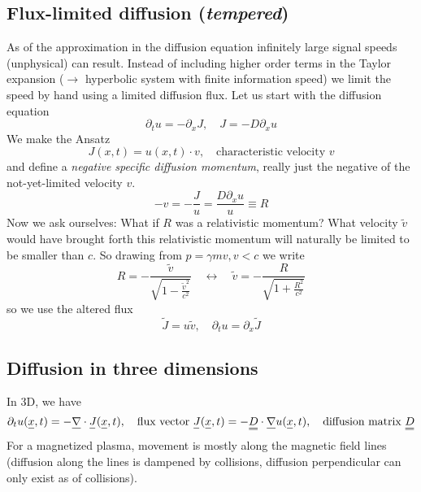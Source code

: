 \subsection{Flux-limited diffusion (\textit{tempered})}
As of the approximation in the diffusion equation infinitely large signal speeds 
(unphysical) can result. Instead of including higher order terms in the Taylor expansion 
($\rightarrow$ hyperbolic system with finite information speed) \textcolor{blue1}{we limit the speed by hand 
using a limited diffusion flux}.
Let us start with the diffusion equation
\begin{equation}
    \partial_t u = - \partial_x J, \quad J = - D \partial_x u
\end{equation}
We make the Ansatz
\begin{equation}
    J(x,t) = u(x,t) \cdot v, \quad \text{characteristic velocity } v
\end{equation}
and define a \textit{negative specific diffusion momentum}, really just the negative of the
not-yet-limited velocity $v$.
\begin{equation}
    -v = -\frac{J}{u} = \frac{D\partial_x u}{u} \equiv R
\end{equation}
Now we ask ourselves: What if $R$ was a relativistic momentum? What velocity $\tilde{v}$ would have brought forth 
this relativistic momentum will
naturally be limited to be smaller than $c$. So drawing from $p = \gamma m v, v<c$ we write
\begin{equation}
    R = - \frac{\tilde{v}}{\sqrt{1-\frac{\tilde{v}^2}{c^2}}} \quad \leftrightarrow \quad \tilde{v} = -\frac{R}{\sqrt{1+\frac{R^2}{c^2}}}
\end{equation}
so we use the altered flux
\begin{equation}
    \tilde{J} = u \tilde{v}, \quad \partial_t u = \partial_x \tilde{J}
\end{equation}

\subsection{Diffusion in three dimensions}
In 3D, we have
\begin{equation}
    \partial_t u(\vec{x}, t) = -\vec{\nabla} \cdot \vec{J}(\vec{x},t), \quad \text{flux vector } \vec{J}(\vec{x},t) = - \mat{D}\cdot \vec{\nabla} u(\vec{x},t), \quad \text{diffusion matrix } \mat{D}
\end{equation}
For a magnetized plasma, movement is mostly 
along the magnetic field lines (diffusion 
along the lines is dampened by collisions, 
diffusion perpendicular can only exist as of 
collisions).


